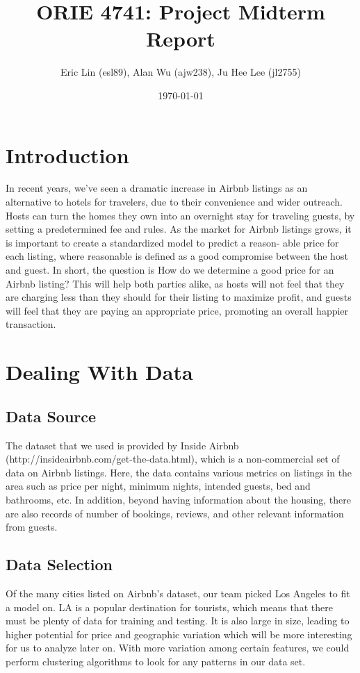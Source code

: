 \documentclass{article}
\title{ORIE 4741: Project Midterm Report}
\author{Eric Lin (esl89), Alan Wu (ajw238), Ju Hee Lee (jl2755)}
\date{\today}
\begin{document}
\maketitle

\section{Introduction}
In recent years, we’ve seen a dramatic increase in Airbnb listings as an alternative to hotels for travelers, due to their convenience and wider outreach. Hosts can turn the homes they own into an overnight stay for traveling guests, by setting a predetermined fee and rules.
As the market for Airbnb listings grows, it is important to create a standardized model to predict a reason- able price for each listing, where reasonable is defined as a good compromise between the host and guest. In short, the question is How do we determine a good price for an Airbnb listing? This will help both parties alike, as hosts will not feel that they are charging less than they should for their listing to maximize profit, and guests will feel that they are paying an appropriate price, promoting an overall happier transaction.

\section{Dealing With Data}
\subsection{Data Source}
The dataset that we used is provided by Inside Airbnb (http://insideairbnb.com/get-the-data.html), which is a non-commercial set of data on Airbnb listings. Here, the data contains various metrics on listings in the area such as price per night, minimum nights, intended guests, bed and bathrooms, etc. In addition, beyond having information about the housing, there are also records of number of bookings, reviews, and other relevant information from guests.

\subsection{Data Selection}
Of the many cities listed on Airbnb’s dataset, our team picked Los Angeles to fit a model on. LA is a popular destination for tourists, which means that there must be plenty of data for training and testing. It is also large in size, leading to higher potential for price and geographic variation which will be more interesting for us to analyze later on. With more variation among certain features, we could perform clustering algorithms to look for any patterns in our data set.
\end{document}
